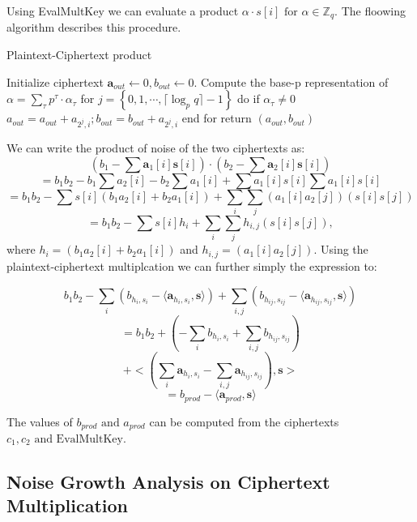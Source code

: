 \documentclass[10pt,journal,compsoc]{IEEEtran}
\theoremstyle{definition}
\begin{document}
Using EvalMultKey we can evaluate a product $\alpha\cdot s[i] \textrm{ for } \alpha \in \mathbb{Z}_q$. The floowing algorithm describes this procedure.
\begin{algorithm}
\caption{Plaintext-Ciphertext product}
\begin{algorithmic}[1]
\State Initialize ciphertext $\textbf{a}_{out}\leftarrow 0,b_{out}\leftarrow 0$.
\State Compute the base-p representation of $\alpha = \sum_{\tau} p^{\tau}\cdot \alpha_\tau$
\State for $j = \left\{ 0,1,\cdots,\lceil \log_p q\rceil -1 \right\}$ do
\State \quad if $\alpha_\tau \neq 0$
\State \quad $a_{out} = a_{out} + a_{2^j,i}; b_{out} = b_{out} + a_{2^j,i}$
\State end for
\State return $\left(a_{out},b_{out}\right)$

\EndProcedure
\end{algorithmic}
\end{algorithm}

We can write the product of noise of the two ciphertexts as:
$$\left(b_1 - \sum \textbf{a}_1[i]\textbf{s}[i] \right)\cdot \left(b_2 - \sum \textbf{a}_2[i]\textbf{s}[i] \right)$$
$$= b_1b_2 - b_1\sum a_{2}[i] - b_2\sum a_{1}[i] + \sum a_1[i]s[i]\sum a_1[i]s[i]$$
$$= b_1b_2 - \sum s[i]\left(b_1a_{2}[i] + b_2 a_{1}[i]\right) + \sum_i\sum_j\left(a_1[i]a_2[j]\right)\left(s[i]s[j]\right)$$
$$= b_1b_2 - \sum s[i]h_i + \sum_i\sum_jh_{i,j}\left(s[i]s[j]\right),$$
where $h_i = \left(b_1a_{2}[i] + b_2 a_{1}[i]\right)$ and $h_{i,j} = \left(a_1[i]a_2[j]\right)$.
Using the plaintext-ciphertext multiplcation we can further simply the expression to:

$$b_1b_2 - \sum_i \left(b_{h_i,s_i} - \langle \textbf{a}_{h_i,s_i},\textbf{s} \rangle\right) + \sum_{i,j} \left(b_{h_{ij},s_{ij}} - \langle \textbf{a}_{h_{ij},s_{ij}},\textbf{s} \rangle\right)$$
$$= b_1b_2 + \left(-\sum_i b_{h_i,s_i} + \sum_{i,j} b_{h_{ij},s_{ij}}\right)$$ 
$$+ \biggl< \left( \sum_i \textbf{a}_{h_i,s_i} - \sum_{i,j}  \textbf{a}_{h_{ij},s_{ij}}\right),\textbf{s}\biggr>$$
$$= b_{prod} - \langle \textbf{a}_{prod},\textbf{s}\rangle $$

The values of $b_{prod} \textrm{ and } a_{prod}$ can be computed from the ciphertexts $c_1, c_2 \textrm{ and EvalMultKey} $.
\subsection{Noise Growth Analysis on Ciphertext Multiplication}
\end{document}
